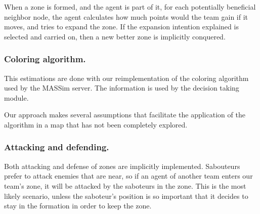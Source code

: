 \documentclass{llncs2e/llncs}
\begin{document}
    When a zone is formed, and the agent is part of it, for each potentially 
    beneficial neighbor node, the agent calculates how much points would the team 
    gain if it moves, and tries to expand the zone.
    If the expansion intention explained is selected and carried on, then a new 
    better zone is implicitly conquered.
    
\subsubsection{Coloring algorithm.}    
    
    This estimations are done with our reimplementation of the coloring algorithm used 
    by the MASSim server. The information is used by the decision taking module.  
    
    Our approach makes several assumptions that facilitate the application of the algorithm
    in a map that has not been completely explored.
    
    
    
    
    


\subsubsection{Attacking and defending.}
    
    Both attacking and defense of zones are implicitly implemented. 
    Sabouteurs prefer to attack enemies that are near, so if an agent of another 
    team enters our team's zone, it will be attacked by the saboteurs in the zone.
    This is the most likely scenario, unless the saboteur's position is so 
    important that it decides to stay in the formation in order to keep the zone.
\end{document}

